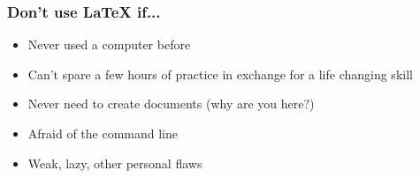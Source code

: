 \documentclass{beamer}
\begin{document}
\begin{frame} \frametitle{Don't use LaTeX if...}
    \begin{itemize}
        \item Never used a computer before
        \item Can't spare a few hours of practice in exchange for a life changing skill
        \item Never need to create documents (why are you here?)
        \item Afraid of the command line
        \item Weak, lazy, other personal flaws
    \end{itemize}
\end{frame}
\end{document}
